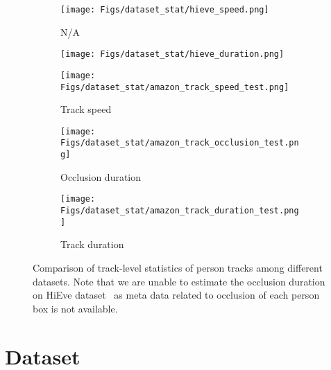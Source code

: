 \documentclass[runningheads]{llncs}
\begin{document}
\begin{figure}[t!]
    \vspace{-1.2em}
    \begin{subfigure}{0.25\textwidth}
        \centering
        \texttt{[image: Figs/dataset\_stat/hieve\_speed.png]}
    \end{subfigure}\begin{subfigure}{0.25\textwidth}
        \centering
N/A
    \end{subfigure}\begin{subfigure}{0.25\textwidth}
         \centering
         \texttt{[image: Figs/dataset\_stat/hieve\_duration.png]}
    \end{subfigure}
    
    \vspace{-1.2em}
    \begin{subfigure}{0.25\textwidth}
        \centering
        \texttt{[image: Figs/dataset\_stat/amazon\_track\_speed\_test.png]}
        \caption{\scriptsize Track speed}
        \label{fig:suppl_dataset_stat_speed}
    \end{subfigure}\begin{subfigure}{0.25\textwidth}
        \centering
        \texttt{[image: Figs/dataset\_stat/amazon\_track\_occlusion\_test.png]}
        \caption{\scriptsize Occlusion duration}
        \label{fig:suppl_dataset_stat_occlusion}
    \end{subfigure}\begin{subfigure}{0.25\textwidth}
         \centering
         \texttt{[image: Figs/dataset\_stat/amazon\_track\_duration\_test.png]}
        \caption{\scriptsize Track duration}
        \label{fig:suppl_dataset_stat_length}
    \end{subfigure}
    
    \caption{\small Comparison of track-level statistics of person tracks among different datasets.  Note that we are unable to estimate the occlusion duration on HiEve dataset~\cite{hieve} as meta data related to occlusion of each person box is not available.
\label{fig:suppl_track_stat}
    }
\end{figure}

\section{Dataset}
\end{document}
